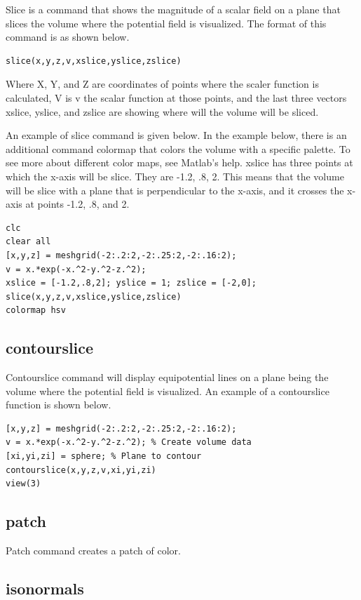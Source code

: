 \documentclass{ximera}
\begin{document}
Slice is a command that shows the magnitude of a scalar field on a plane that slices the volume where the potential field is visualized. The format of this command is as shown below.

\begin{verbatim}
slice(x,y,z,v,xslice,yslice,zslice)
\end{verbatim}

Where X, Y, and Z are coordinates of points where the scaler function is calculated, V is v the scalar function at those points, and the last three vectors xslice, yslice, and zslice  are showing where will the volume will be sliced.

An example of slice command is given below. In the example below, there is an additional command colormap that colors the volume with a specific palette. To see more about different color maps, see Matlab's help. xslice has three points at which the x-axis will be slice. They are -1.2, .8, 2. This means that the volume will be slice with a plane that is perpendicular to the x-axis, and it crosses the x-axis at points -1.2, .8, and 2. 
 
\begin{verbatim}
clc
clear all
[x,y,z] = meshgrid(-2:.2:2,-2:.25:2,-2:.16:2);
v = x.*exp(-x.^2-y.^2-z.^2);
xslice = [-1.2,.8,2]; yslice = 1; zslice = [-2,0];
slice(x,y,z,v,xslice,yslice,zslice)
colormap hsv
\end{verbatim}

\subsection{contourslice}

 Contourslice command will display equipotential lines on a plane being the volume where the potential field is visualized. An example of a contourslice function is shown below.

\begin{verbatim}
[x,y,z] = meshgrid(-2:.2:2,-2:.25:2,-2:.16:2);
v = x.*exp(-x.^2-y.^2-z.^2); % Create volume data
[xi,yi,zi] = sphere; % Plane to contour
contourslice(x,y,z,v,xi,yi,zi)
view(3)
\end{verbatim}

\subsection{patch}

Patch command creates a patch of color.


\subsection{isonormals}
\end{document}
